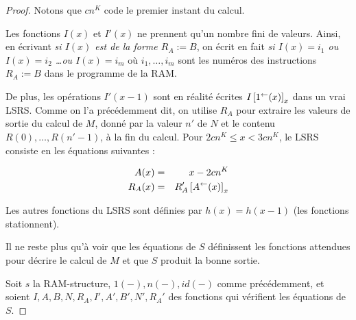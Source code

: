 \begin{appendices}
\begin{proof}
			\espace 
			
			Notons que $cn^K$ code le premier instant du calcul. 
			
			Les fonctions $I(x)$ et $I'(x)$ ne prennent qu'un nombre fini de valeurs. Ainsi, en écrivant \emph{si $I(x)$ est de la forme $R_A := B$}, on écrit en fait \emph{si $I(x) = i_1$ ou $I(x) = i_2$ \dots ou $I(x) = i_m$} où $i_1, \dots, i_m$ sont les numéros des instructions $R_A := B$ dans le programme de la RAM.
			
			De plus, les opérations $I'(x-1)$ sont en réalité écrites $I\left[ 1^{\leftarrow}(x) \right]_{x}$ dans un vrai LSRS. Comme on l'a précédemment dit, on utilise $R_A$ pour extraire les valeurs de sortie du calcul de $M$, donné par la valeur $n'$ de $N$ et le contenu $R(0), \dots, R(n'-1)$, à la fin du calcul. Pour $2cn^K \leqslant x < 3cn^K$, le LSRS consiste en les équations suivantes :
			
	 
			\begin{eqnarray}
			A(x) & = & x - 2cn^K \\
			R_A(x) & = & R_A'\left[ A^{\leftarrow}(x) \right]_{x}
			\end{eqnarray}
			
			Les autres fonctions du LSRS sont définies par $h(x) = h(x-1)$ (les fonctions stationnent).
			
			Il ne reste plus qu'à voir que les équations de $S$ définissent les fonctions attendues pour décrire le calcul de $M$ et que $S$ produit la bonne sortie.
			
			Soit $s$ la RAM-structure, $1(-), n(-), id(-)$ \footnotemark comme précédemment, et soient $I, A, B, N, R_A, I', A', B', N', R_A'$ des fonctions qui vérifient les équations de $S$.
			
			

\end{proof}
\end{appendices}
